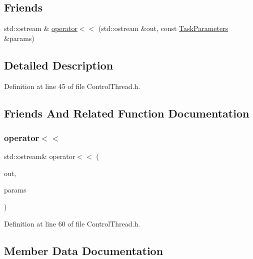 \subsection*{Friends}
\begin{DoxyCompactItemize}
\item 
std\+::ostream \& \hyperlink{classocra__recipes_1_1TaskParameters_a8efa666207faa3291d83472bfee94a08}{operator$<$$<$} (std\+::ostream \&out, const \hyperlink{classocra__recipes_1_1TaskParameters}{Task\+Parameters} \&params)
\end{DoxyCompactItemize}


\subsection{Detailed Description}


Definition at line 45 of file Control\+Thread.\+h.



\subsection{Friends And Related Function Documentation}
\hypertarget{classocra__recipes_1_1TaskParameters_a8efa666207faa3291d83472bfee94a08}{}\label{classocra__recipes_1_1TaskParameters_a8efa666207faa3291d83472bfee94a08} 
\subsubsection{\texorpdfstring{operator$<$$<$}{operator<<}}
{\footnotesize\ttfamily std\+::ostream\& operator$<$$<$ (\begin{DoxyParamCaption}\item[{std\+::ostream \&}]{out,  }\item[{const \hyperlink{classocra__recipes_1_1TaskParameters}{Task\+Parameters} \&}]{params }\end{DoxyParamCaption})\hspace{0.3cm}{\ttfamily [friend]}}



Definition at line 60 of file Control\+Thread.\+h.



\subsection{Member Data Documentation}
\hypertarget{classocra__recipes_1_1TaskParameters_a323bf15f03055fcbf07f865ba9074381}{}\label{classocra__recipes_1_1TaskParameters_a323bf15f03055fcbf07f865ba9074381} 
